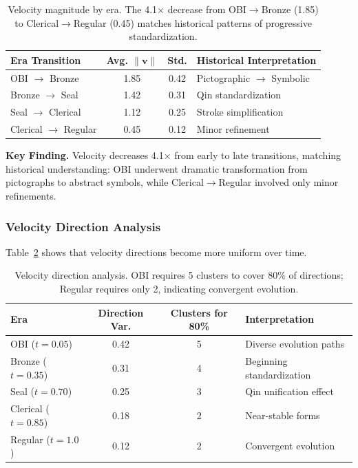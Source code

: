 \documentclass{article}
\begin{document}
\begin{table}[h]
\centering
\caption{Velocity magnitude by era. The 4.1$\times$ decrease from OBI$\to$Bronze (1.85) to Clerical$\to$Regular (0.45) matches historical patterns of progressive standardization.}
\label{tab:velocity_magnitude}
\begin{tabular}{lccl}
\toprule
\textbf{Era Transition} & \textbf{Avg. $\|\mathbf{v}\|$} & \textbf{Std.} & \textbf{Historical Interpretation} \\
\midrule
OBI $\to$ Bronze & 1.85 & 0.42 & Pictographic $\to$ Symbolic \\
Bronze $\to$ Seal & 1.42 & 0.31 & Qin standardization \\
Seal $\to$ Clerical & 1.12 & 0.25 & Stroke simplification \\
Clerical $\to$ Regular & 0.45 & 0.12 & Minor refinement \\
\bottomrule
\end{tabular}
\end{table}

\textbf{Key Finding.} Velocity decreases 4.1$\times$ from early to late transitions, matching historical understanding: OBI underwent dramatic transformation from pictographs to abstract symbols, while Clerical$\to$Regular involved only minor refinements.

\subsubsection{Velocity Direction Analysis}

Table~\ref{tab:velocity_direction} shows that velocity directions become more uniform over time.

\begin{table}[h]
\centering
\caption{Velocity direction analysis. OBI requires 5 clusters to cover 80\% of directions; Regular requires only 2, indicating convergent evolution.}
\label{tab:velocity_direction}
\begin{tabular}{lccl}
\toprule
\textbf{Era} & \textbf{Direction Var.} & \textbf{Clusters for 80\%} & \textbf{Interpretation} \\
\midrule
OBI ($t=0.05$) & 0.42 & 5 & Diverse evolution paths \\
Bronze ($t=0.35$) & 0.31 & 4 & Beginning standardization \\
Seal ($t=0.70$) & 0.25 & 3 & Qin unification effect \\
Clerical ($t=0.85$) & 0.18 & 2 & Near-stable forms \\
Regular ($t=1.0$) & 0.12 & 2 & Convergent evolution \\
\bottomrule
\end{tabular}
\end{table}
\end{document}
